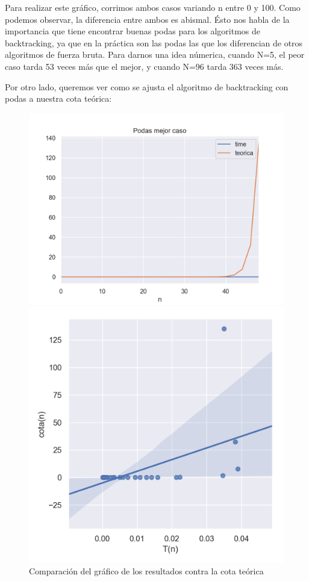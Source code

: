 Para realizar este gráfico, corrimos ambos casos variando n entre 0 y 100. Como podemos observar, la diferencia entre ambos es abismal. Ésto nos habla de la importancia que tiene encontrar buenas podas para los algoritmos de backtracking, ya que en la práctica son las podas las que los diferencian de otros algoritmos de fuerza bruta. Para darnos una idea númerica, cuando N=5, el peor caso tarda 53 veces más que el mejor, y cuando N=96 tarda 363 veces más.

Por otro lado, queremos ver como se ajusta el algoritmo de backtracking con podas a nuestra cota teórica:

\begin{figure}[H]
   \begin{minipage}{0.5\textwidth}
     \centering
     \includegraphics[width=1\linewidth]{img/mejor_Figure_1}
     \caption{Comparación del gráfico de los resultados contra la cota teórica}
   \end{minipage}\hfill
   \begin{minipage}{0.5\textwidth}
     \centering
     \includegraphics[width=1\linewidth]{img/mejor_Figure_2}

\end{minipage}
\end{figure}
